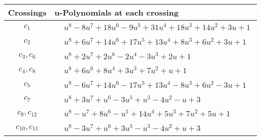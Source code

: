 \documentclass[1p]{elsarticle_modified}
\theoremstyle{definition}
\begin{document}
\begin{tabular}{m{50pt}|m{274pt}}
Crossings & \hspace{64pt}u-Polynomials at each crossing \\
\hline $$\begin{aligned}c_{1}\end{aligned}$$&$\begin{aligned}
&u^8-8 u^7+18 u^6-9 u^5+31 u^4+18 u^3+14 u^2+3 u+1
\end{aligned}$\\
\hline $$\begin{aligned}c_{2}\end{aligned}$$&$\begin{aligned}
&u^8+6 u^7+14 u^6+17 u^5+13 u^4+8 u^3+6 u^2+3 u+1
\end{aligned}$\\
\hline $$\begin{aligned}c_{3},c_{6}\end{aligned}$$&$\begin{aligned}
&u^8+2 u^7+2 u^6-2 u^4-3 u^3+2 u+1
\end{aligned}$\\
\hline $$\begin{aligned}c_{4},c_{8}\end{aligned}$$&$\begin{aligned}
&u^8+6 u^6+8 u^4+3 u^3+7 u^2+u+1
\end{aligned}$\\
\hline $$\begin{aligned}c_{5}\end{aligned}$$&$\begin{aligned}
&u^8-6 u^7+14 u^6-17 u^5+13 u^4-8 u^3+6 u^2-3 u+1
\end{aligned}$\\
\hline $$\begin{aligned}c_{7}\end{aligned}$$&$\begin{aligned}
&u^8+3 u^7+u^6-3 u^5+u^3-4 u^2- u+3
\end{aligned}$\\
\hline $$\begin{aligned}c_{9},c_{12}\end{aligned}$$&$\begin{aligned}
&u^8- u^7+8 u^6- u^5+14 u^4+5 u^3+7 u^2+5 u+1
\end{aligned}$\\
\hline $$\begin{aligned}c_{10},c_{11}\end{aligned}$$&$\begin{aligned}
&u^8-3 u^7+u^6+3 u^5- u^3-4 u^2+u+3
\end{aligned}$\\
\hline
\end{tabular}\\~\\
\end{document}
